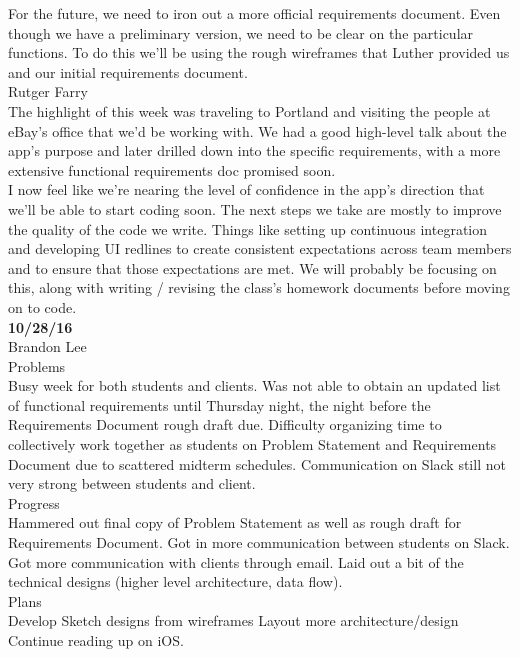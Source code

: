 \documentclass[letterpaper,10pt,titlepage]{article}
\begin{document}
For the future, we need to iron out a more official requirements document. Even though we have a preliminary version, we need to be clear on the particular functions. To do this we'll be using the rough wireframes that Luther provided us and our initial requirements document.\\

Rutger Farry\\

The highlight of this week was traveling to Portland and visiting the people at eBay's office that we'd be working with. We had a good high-level talk about the app's purpose and later drilled down into the specific requirements, with a more extensive functional requirements doc promised soon.\\

I now feel like we're nearing the level of confidence in the app's direction that we'll be able to start coding soon. The next steps we take are mostly to improve the quality of the code we write. Things like setting up continuous integration and developing UI redlines to create consistent expectations across team members and to ensure that those expectations are met. We will probably be focusing on this, along with writing / revising the class's homework documents before moving on to code.\\

\textbf{10/28/16}\\

Brandon Lee\\

Problems\\
Busy week for both students and clients. Was not able to obtain an updated list of functional requirements until Thursday night, the night before the Requirements Document rough draft due.
Difficulty organizing time to collectively work together as students on Problem Statement and Requirements Document due to scattered midterm schedules.
Communication on Slack still not very strong between students and client.\\

Progress\\
Hammered out final copy of Problem Statement as well as rough draft for Requirements Document.
Got in more communication between students on Slack.
Got more communication with clients through email.
Laid out a bit of the technical designs (higher level architecture, data flow).\\

Plans\\
Develop Sketch designs from wireframes
Layout more architecture/design
Continue reading up on iOS.\\
\end{document}
